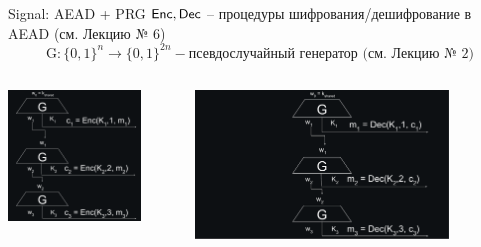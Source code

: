 \documentclass[usenames,dvipsnames,8pt,aspectratio=169]{beamer}
\begin{document}
\begin{frame}{Signal: AEAD + PRG}
\Large 
$\textsf{Enc},\textsf{Dec}$ -- процедуры шифрования/дешифрование в AEAD (см. Лекцию № 6)
\[
\text{G}: \{0,1\}^n \rightarrow \{0,1\}^{2n} - \text{псевдослучайный генератор (см. Лекцию № 2)}
\]
	\vspace{-10pt}
	\begin{columns}
		\hspace{-30pt}
		\begin{column}{0.5\textwidth}
			\centering
			\includegraphics[width=0.8\textwidth]{SendSignal}
		\end{column}
		\hspace{-80pt}
		\begin{column}{0.5\textwidth}
			\centering
			\pause 
			\includegraphics[width=0.8\textwidth]{ReceiveSignal}
		\end{column}
	\end{columns}
\end{frame}
\end{document}
